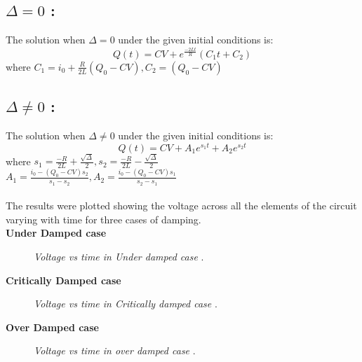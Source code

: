 \documentclass[12pt, a4paper]{report}
\begin{document}
\subsection*{$\Delta = 0$ :}
The solution when $\Delta = 0$ under the given initial conditions is:
\begin{equation}
 Q(t) = CV + e^\frac{-2Lt}{R}(C_1t + C_2)
\end{equation}
where $C_1 = i_0+\frac{R}{2L}(Q_0-CV) , C_2 = (Q_0 - CV)$
\subsection*{$\Delta \ne 0$ :}
The solution when $\Delta \ne 0$ under the given initial conditions is:
\begin{equation}
 Q(t) = CV + A_1e^{s_1t} + A_2e^{s_2t}
\end{equation}
where $s_1 = \frac{-R}{2L} + \frac{\sqrt{\Delta}}{2} , s_2 = \frac{-R}{2L} - \frac{\sqrt{\Delta}}{2}$ \\
$A_1 = \frac{i_0 - (Q_0 - CV)s_2}{s_1 - s_2} , A_2 = \frac{i_0 - (Q_0 - CV)s_1}{s_2 - s_1}$ \\
\\

The results were plotted showing the voltage across all the elements of the circuit varying with time for three cases of damping.\\

\textbf{Under Damped case}
\begin{figure}[H]
  \centering
  \caption[Voltage vs time in Under damped case]    
  {\textit{Voltage vs time in Under damped case}
  \label{Fig:1}
  \footnotemark.}
\end{figure}
\pagebreak
\textbf{Critically Damped case}
\begin{figure}[H]
  \centering
  \caption[Voltage vs time in Critically damped case]    
  {\textit{Voltage vs time in Critically damped case}
  \label{Fig:2}
  \footnotemark.}
\end{figure}
\textbf{Over Damped case}
\begin{figure}[H]
  \centering
  \caption[Voltage vs time in over damped case]    
  {\textit{Voltage vs time in over damped case}
  \label{Fig:3}
  \footnotemark.}
\end{figure}



\end{document}
